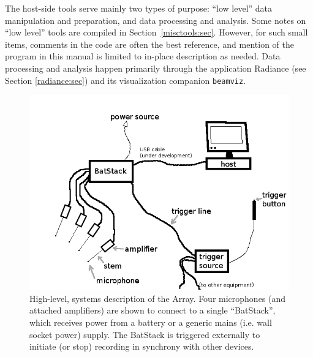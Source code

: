 \documentclass[letterpaper]{article}
\begin{document}
The host-side tools serve mainly two types of purpose: ``low level''
data manipulation and preparation, and data processing and analysis.
Some notes on ``low level'' tools are compiled in
Section~\ref{misctools:sec}. However, for such small items, comments
in the code are often the best reference, and mention of the program
in this manual is limited to in-place description as needed. Data
processing and analysis happen primarily through the application
Radiance (see Section \ref{radiance:sec}) and its visualization
companion \texttt{beamviz}.

\begin{figure}
\centering
\includegraphics[width=5in]{figures/hilevel_desc.png}
\caption[High-level system description]{High-level, systems
  description of the Array. Four microphones (and attached amplifiers)
  are shown to connect to a single ``BatStack'', which receives power
  from a battery or a generic mains (i.e. wall socket power)
  supply. The BatStack is triggered externally to initiate (or stop)
  recording in synchrony with other devices.}
\label{blocksys:fig}
\end{figure}
\end{document}
